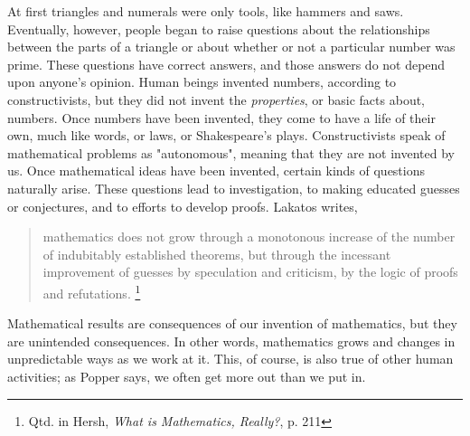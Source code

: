      At first triangles and numerals were only tools, like hammers and saws.  Eventually, however, people began to raise questions about the relationships between the parts of a triangle or about whether or not a particular number was prime.  These questions have correct answers, and those answers do not depend upon anyone's opinion.  Human beings invented numbers, according to constructivists, but they did not invent the \emph{properties}, or basic facts about, numbers.  Once numbers have been invented, they come to have a life of their own, much like words, or laws, or Shakespeare's plays.  Constructivists speak of mathematical problems as "autonomous", meaning that they are not invented by us.  Once mathematical ideas have been invented, certain kinds of questions naturally arise.  These questions lead to investigation, to making educated guesses or conjectures, and to efforts to develop proofs.  Lakatos writes, 
\begin{quote}
          mathematics does not grow through a monotonous increase of the
          number of indubitably established theorems, but through the incessant
          improvement of guesses by speculation and criticism, by the logic of 
          proofs and refutations. \footnote{Qtd. in Hersh, \textit{What is Mathematics, Really?}, p. 211 }
\end{quote}  
          
Mathematical results are consequences of our invention of mathematics, but they are unintended consequences.  In other words, mathematics grows and changes in unpredictable ways as we work at it.  This, of course, is also true of other human activities; as Popper says, we often get more out than we put in. 
 
